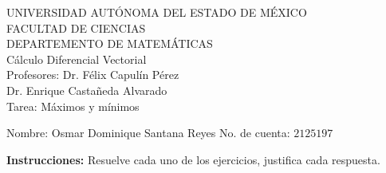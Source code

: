 \documentclass[fleqn, 12pt]{article}
\begin{document}
    \begin{center}
        UNIVERSIDAD AUTÓNOMA DEL ESTADO DE MÉXICO \\
        FACULTAD DE CIENCIAS \\
        DEPARTEMENTO DE MATEMÁTICAS \\
        Cálculo Diferencial Vectorial \\
        Profesores: Dr. Félix Capulín Pérez \\
        Dr. Enrique Castañeda Alvarado \\
        Tarea: Máximos y mínimos
    \end{center}

    Nombre: Osmar Dominique Santana Reyes \hfill No. de cuenta: $ 2125197 $

    \textbf{Instrucciones:} Resuelve cada uno de los ejercicios, justifica cada respuesta.
\end{document}
